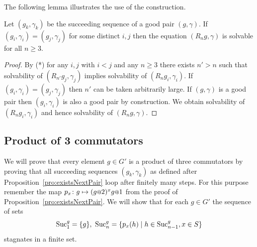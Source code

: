 \documentclass[a4paper,11pt]{amsart}
\begin{document}
  The following lemma illustrates the use of the construction.

  \begin{lem}
  Let $(g_k,\gamma_k)$ be the succeeding sequence of a good pair $(g,\gamma)$. 
  If $(g_i,\gamma_i) = (g_j,\gamma_j)$ for some distinct $i,j$ then the equation $(R_ng,\gamma)$ is solvable for 
  all $n \ge 3$.
  \end{lem}
  \begin{proof}
  By (*) for any $i,j$ with $i < j$ and any $n \ge 3$ there exists $n' > n$ such that solvability of 
  $(R_{n'}g_j,\gamma_j)$ implies solvability of $(R_{n}g_i,\gamma_i)$. If $(g_i,\gamma_i) = (g_j,\gamma_j)$
  then $n'$ can be taken arbitrarily large. If $(g,\gamma)$ is a good pair then $(g_i,\gamma_i)$ is also a good pair
  by construction. We obtain solvability of $(R_n g_i,\gamma_i)$ and hence solvability of $(R_n g,\gamma)$.
  \end{proof}

 
 
%  
%  
\subsection{Product of 3 commutators}
We will prove that every element $g\in G'$ is a product of three commutators by proving that all
succeeding sequences $(g_k,\gamma_k)$ as defined after Proposition~\ref{pro:existsNextPair} 
loop after finitely many steps.
For this purpose remember the map $p_x\colon g \mapsto (g\at{2})^x g\at{1}$ from the proof of Proposition~\ref{pro:existsNextPair}.
We will show that for each $g\in G'$ the sequence of sets 
\[\textup{Suc}_1^g=\{g\},\ \textup{Suc}_n^g = \{p_x(h) \mid h\in \textup{Suc}_{n-1}^g, x\in S\} \]
stagnates in a finite set. 
\end{document}
